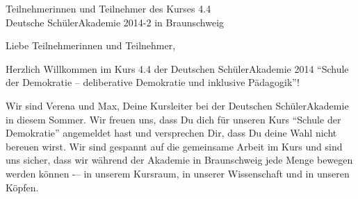 \documentclass[a4paper]{letter}
\date{15.\ April 2014}
\begin{document}
\begin{letter}{
	Teilnehmerinnen und Teilnehmer des Kurses 4.4 \\
	Deutsche SchülerAkademie 2014-2 in Braunschweig}

\opening{Liebe Teilnehmerinnen und Teilnehmer,}

Herzlich Willkommen im Kurs 4.4 der Deutschen SchülerAkademie 2014 ``Schule der Demokratie -- deliberative Demokratie und inklusive Pädagogik''!

Wir sind Verena und Max, Deine Kursleiter bei der Deutschen SchülerAkademie in diesem Sommer.
Wir freuen uns, dass Du dich für unseren Kurs ``Schule der Demokratie'' angemeldet hast und versprechen Dir, dass Du deine Wahl nicht bereuen wirst.
Wir sind gespannt auf die gemeinsame Arbeit im Kurs und sind uns sicher, dass wir während der Akademie in Braunschweig jede Menge bewegen werden können -– in unserem Kursraum, in unserer Wissenschaft und in unseren Köpfen.



\end{letter}
\end{document}
